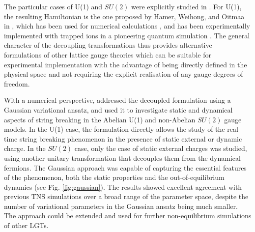 \documentclass[epj,final]{svjour}
\begin{document}
The particular cases of U(1) and $SU(2)$ were explicitly studied in  \cite{sala2018pos}. For U(1), the resulting Hamiltonian is the one proposed by Hamer, Weihong, and Oitmaa in \cite{Hamer1997}, which has been used for numerical calculations \cite{Hamer1997,Banuls2013,Banuls2015}, and has been experimentally implemented with trapped ions in a pioneering quantum simulation \cite{martinez2016real}. The general character of the decoupling transformations thus provides alternative formulations of other lattice gauge theories which can be suitable for experimental implementation with the advantage of being directly defined in the physical space and not requiring the explicit realisation of any gauge degrees of freedom.
 
With a numerical perspective, \cite{sala2018pos} addressed the decoupled formulation using a Gaussian variational ansatz, and used it to investigate static and dynamical aspects of string breaking in the Abelian U(1) and non-Abelian $SU(2)$ gauge models. In the U(1) case, the formulation directly allows the study of the real-time string breaking phenomenon in the presence of static external or dynamic charge. In the $SU(2)$ case, only the case of static external charges was studied, using another unitary transformation that decouples them from the dynamical fermions. The Gaussian approach was capable of capturing the essential features of the phenomenon, both the static properties and the out-of-equilibrium dynamics (see Fig. \ref{fig:gaussian}). The results showed excellent agreement with previous TNS simulations over a broad range of the parameter space, despite the number of variational parameters in the Gaussian ansatz being much smaller. The approach could be extended and used for further non-equilibrium simulations of other LGTs.
 
\end{document}

